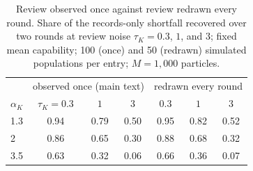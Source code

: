 \begin{table}[t]
\centering
\small
\caption{Review observed once against review redrawn every round. Share of the records-only shortfall recovered over two rounds at review noise $\tau_K = 0.3$, $1$, and $3$; fixed mean capability; 100 (once) and 50 (redrawn) simulated populations per entry; $M = 1{,}000$ particles.}
\label{tab:sens-fresh}
\begin{tabular}{@{}lcccccc@{}}
\toprule
& \multicolumn{3}{c}{observed once (main text)} & \multicolumn{3}{c}{redrawn every round} \\
$\alpha_K$ & $\tau_K = 0.3$ & $1$ & $3$ & $0.3$ & $1$ & $3$ \\
\midrule
1.3 & 0.94 & 0.79 & 0.50 & 0.95 & 0.82 & 0.52 \\
2 & 0.86 & 0.65 & 0.30 & 0.88 & 0.68 & 0.32 \\
3.5 & 0.63 & 0.32 & 0.06 & 0.66 & 0.36 & 0.07 \\
\bottomrule
\end{tabular}
\end{table}
